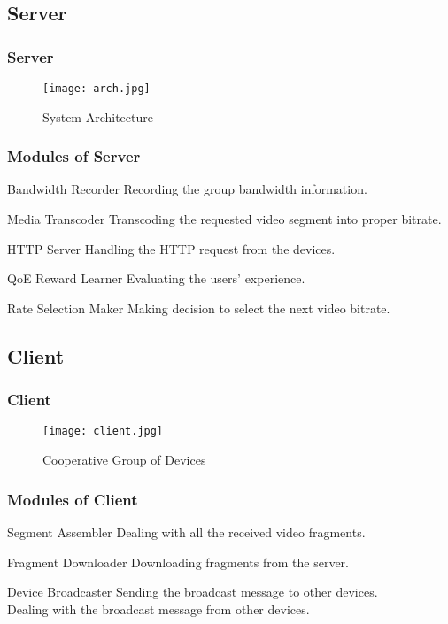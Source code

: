 \documentclass[table]{beamer}
\begin{document}
\subsection{Server}
\begin{frame}
	\frametitle{Server}
	\begin{figure}[htbp]
    \centering
		\texttt{[image: arch.jpg]}
    \caption{System Architecture}
    \label{fig:server}
    \end{figure}
\end{frame}

\begin{frame}%
	\frametitle{Modules of Server}
	\begin{block}{Bandwidth Recorder}
	\scriptsize
	Recording the group bandwidth information.
	\end{block}
	\begin{block}{Media Transcoder}
	\scriptsize
	Transcoding the requested video segment into proper bitrate.
	\end{block}
	\begin{block}{HTTP Server}
	\scriptsize
	Handling the HTTP request from the devices.
	\end{block}
	\begin{block}{QoE Reward Learner}
	\scriptsize
	Evaluating the users’ experience.
	\end{block}
	\begin{block}{Rate Selection Maker}
	\scriptsize
	Making decision to select the next video bitrate.
	\end{block}
\end{frame}

\subsection{Client}
\begin{frame}
	\frametitle{Client}
	\begin{figure}[htbp]
    \centering
		\texttt{[image: client.jpg]}
    \caption{Cooperative Group of Devices}
    \label{fig:client}
    \end{figure}
\end{frame}

\begin{frame}%
	\frametitle{Modules of Client}
	\begin{block}{Segment Assembler}
	\scriptsize
	Dealing with all the received video fragments. 
	\end{block}
	\begin{block}{Fragment Downloader}
	\scriptsize
	Downloading fragments from the server.
	\end{block}
	\begin{block}{Device Broadcaster}
	\scriptsize
	Sending the broadcast message to other devices.\\
	Dealing with the broadcast message from other devices.
	\end{block}
\end{frame}
\end{document}
